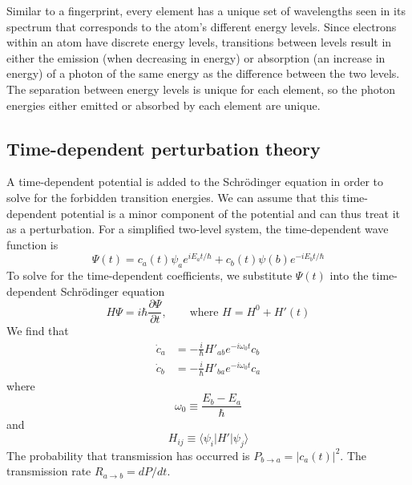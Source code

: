 Similar to a fingerprint, every element has a unique set of wavelengths seen in 
its spectrum that corresponds to the atom's different energy levels.  Since 
electrons within an atom have discrete energy levels, transitions between levels 
result in either the emission (when decreasing in energy) or absorption 
(an increase in energy) of a photon of the same energy as the difference between 
the two levels.  The separation between energy levels is unique for each 
element, so the photon energies either emitted or absorbed by each element are 
unique.


\subsection{Time-dependent perturbation theory}

A time-dependent potential is added to the Schr\"{o}dinger equation in order to 
solve for the forbidden transition energies.  We can assume that this 
time-dependent potential is a minor component of the potential and can thus 
treat it as a perturbation.  For a simplified two-level system, the 
time-dependent wave function is
\begin{equation}
    \Psi (t) = c_a (t) \psi_a e^{iE_a t/\hbar} + c_b (t) \psi (b) e^{-iE_b t/\hbar}
\end{equation}
To solve for the time-dependent coefficients, we substitute $\Psi (t)$ into the 
time-dependent Schr\"{o}dinger equation
\begin{equation}
    H\Psi = i\hbar \frac{\partial \Psi}{\partial t}, \qquad \text{where } H = H^0 + H'(t)
\end{equation}
We find that
\begin{align}
    \dot{c}_a &= -\frac{i}{\hbar} H'_{ab} e^{-i\omega_0 t} c_b\\
    \dot{c}_b &= -\frac{i}{\hbar} H'_{ba} e^{-i\omega_0 t} c_a
\end{align}
where
\begin{equation}
    \omega_0 \equiv \frac{E_b - E_a}{\hbar}
\end{equation}
and
\begin{equation}
    H_{ij} \equiv \langle \psi_i | H' | \psi_j \rangle
\end{equation}
The probability that transmission has occurred is $P_{b\to a} = |c_a (t)|^2$.  
The transmission rate $R_{a\to b} = dP/dt$.

